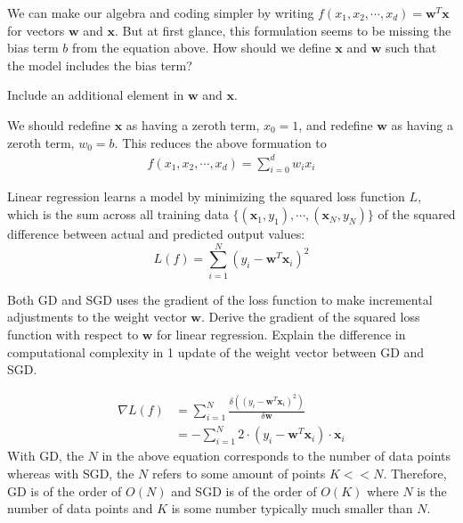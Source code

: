 \begin{problem}[1]
  We can make our algebra and coding simpler by writing $f(x_1, x_2, \cdots, x_d) = \mathbf{w}^T\mathbf{x}$ for vectors $\mathbf{w}$ and $\mathbf{x}$.  But at first glance, this formulation seems to be missing the bias term $b$ from the equation above.  How should we define $\mathbf{x}$ and $\mathbf{w}$ such that the model includes the bias term?
\end{problem}
\begin{hint}
  Include an additional element in $\mathbf{w}$ and $\mathbf{x}$.
\end{hint}
\begin{solution}
  We should redefine $\mathbf{x}$ as having a zeroth term, $x_{0} = 1$, and redefine $\mathbf{w}$ as having a zeroth term, $w_{0} = b$. This reduces the above formuation to 
  \begin{align*}
    f(x_1, x_2, \cdots, x_d) = \sum_{i=0}^d w_i x_i
  \end{align*}
\end{solution}

Linear regression learns a model by minimizing the squared loss function $L$, which is the sum across all training data $\{(\mathbf{x}_1, y_1),\cdots,(\mathbf{x}_N, y_N)\}$ of the squared difference between actual and predicted output values:
\[L(f) = \sum_{i=1}^N (y_i - \mathbf{w}^T\mathbf{x}_i)^2\]

\begin{problem}[2]
  Both GD and SGD uses the gradient of the loss function to make incremental adjustments to the weight vector $\mathbf{w}$. Derive the gradient of the squared loss function with respect to $\mathbf{w}$ for linear regression. Explain the difference in computational complexity in 1 update of the weight vector between GD and SGD. 
\end{problem}
\begin{solution}
  \begin{align*}
    \nabla L(f) & = \sum_{i=1}^N \frac{\delta ((y_i - \mathbf{w}^T\mathbf{x}_i)^2)}{\delta \mathbf{w}} \\
    & = -\sum_{i=1}^N 2\cdot(y_i - \mathbf{w}^T\mathbf{x}_i)\cdot \mathbf{x}_i
  \end{align*}
  With GD, the $N$ in the above equation corresponds to the number of data points whereas with SGD, the $N$ refers to some amount of points $K << N$. Therefore, GD is of the order of $O(N)$ and SGD is of the order of $O(K)$ where $N$ is the number of data points and $K$ is some number typically much smaller than $N$.
\end{solution}

